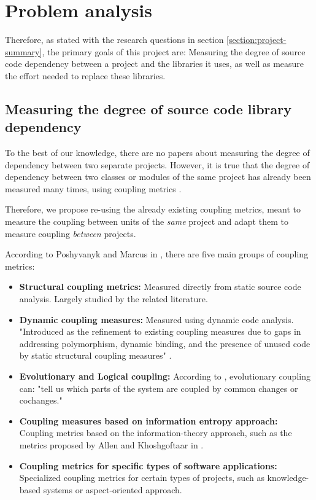 \section{Problem analysis} %

Therefore, as stated with the research questions in section \ref{section:project-summary}, the primary goals of this project are:
Measuring the degree of source code dependency between a project and the libraries it uses, as well as measure the effort needed to replace these libraries.

\subsection{Measuring the degree of source code library dependency}
To the best of our knowledge, there are no papers about measuring the degree of dependency between two separate projects. However, it is true that the degree of dependency between two classes or modules of the same project has already been measured many times, using coupling metrics \cite{yu2011measurement}.

Therefore, we propose re-using the already existing coupling metrics, meant to measure the coupling between units of the \textit{same} project and adapt them to measure coupling \textit{between} projects.

\bigskip\noindent
According to Poshyvanyk and Marcus in \cite{poshyvanyk2006conceptual}, there are five main groups of coupling metrics:

\begin{itemize}
  \item \textbf{Structural coupling metrics:} Measured directly from static source code analysis. Largely studied by the related literature.

  \item \textbf{Dynamic coupling measures:} Measured using dynamic code analysis. "Introduced as the refinement to existing coupling measures due to gaps in addressing polymorphism, dynamic binding, and the presence of unused code by static structural coupling measures" \cite{poshyvanyk2006conceptual}.

  \item \textbf{Evolutionary and Logical coupling:} According to \cite{zimmermann2005mining}, evolutionary coupling can: "tell us which parts of the system are coupled by common changes or cochanges."

  \item \textbf{Coupling measures based on information entropy approach:} Coupling metrics based on the information-theory approach, such as the metrics proposed by Allen and Khoshgoftaar in \cite{allen1999measuring}.

  \item \textbf{Coupling metrics for specific types of software applications:} Specialized coupling metrics for certain types of projects, such as knowledge-based systems or aspect-oriented approach.
\end{itemize}

